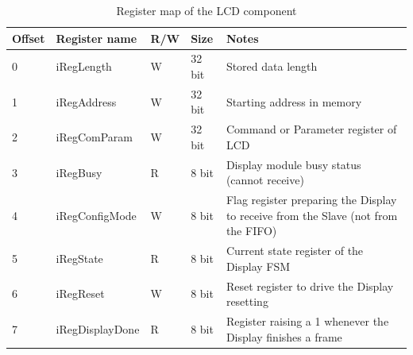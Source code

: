 \begin{table}[h!]
    \centering
    \caption{Register map of the LCD component}
    \label{tab:register-map}
    \begin{tabular}{ | p{1cm} | p{3.5cm} | p{1cm} | p{1cm} | p{6cm} | }
        \hline
        Offset      & Register name     & R/W   & Size       & Notes \\
        \hline
        \hline
        0   & iRegLength        & W     & 32 bit     &  Stored data length \\
        1   & iRegAddress       & W     & 32 bit     &  Starting address in memory\\
        2   & iRegComParam      & W     & 32 bit     &  Command or Parameter register of LCD \\
        3   & iRegBusy          & R     & 8 bit      &  Display module busy status (cannot receive)\\
        4   & iRegConfigMode    & W     & 8 bit      &  Flag register preparing the Display to receive from the                                                       Slave (not from the FIFO)\\
        5   & iRegState         & R     & 8 bit      &  Current state register of the Display FSM\\
        6   & iRegReset         & W     & 8 bit      &  Reset register to drive the Display resetting\\
        7   & iRegDisplayDone   & R     & 8 bit      &  Register raising a 1 whenever the Display finishes a frame\\
        \hline
    \end{tabular}
\end{table}